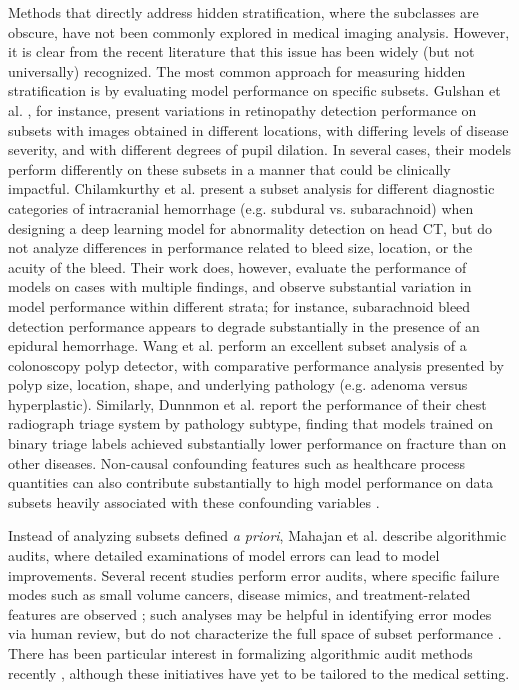 \documentclass[sigconf]{acmart}
\begin{document}
Methods that directly address hidden stratification, where the subclasses are obscure, have not been commonly explored in medical imaging analysis.  
However, it is clear from the recent literature that this issue has been widely (but not universally) recognized.  
The most common approach for measuring hidden stratification is by evaluating model performance on specific subsets.
Gulshan et al. \citep{Gulshan2016-we}, for instance, present variations in retinopathy detection performance on subsets with images obtained in different locations, with differing levels of disease severity, and with different degrees of pupil dilation.  
In several cases, their models perform differently on these subsets in a manner that could be clinically impactful.  
Chilamkurthy et al. \citep{Chilamkurthy2018-op}  present a subset analysis for different diagnostic categories of intracranial hemorrhage (e.g. subdural vs. subarachnoid) when designing a deep learning model for abnormality detection on head CT, but do not analyze differences in  performance related to bleed size, location, or the acuity of the bleed. 
 Their work does, however, evaluate the performance of models on cases with multiple findings, and observe substantial variation in model performance within different strata; for instance, subarachnoid bleed detection performance appears to degrade substantially in the presence of an epidural hemorrhage.  
Wang et al. \citep{Wang2019-jr} perform an excellent subset analysis of a colonoscopy polyp detector, with comparative performance analysis presented by polyp size, location, shape, and underlying pathology (e.g. adenoma versus hyperplastic).  
 Similarly, Dunnmon et al. \citep{Dunnmon2019-rr} report the performance of their chest radiograph triage system by pathology subtype, finding that models trained on binary triage labels achieved substantially lower performance on fracture than on other diseases.   
Non-causal confounding features such as healthcare process quantities can also contribute substantially to high model performance on data subsets heavily associated with these confounding variables \citep{Winkler2019-fw, Badgeley2019-zi, Agniel2018-qp, Zech2018-xq}.

Instead of analyzing subsets defined \textit{a priori}, Mahajan et al. \citep{Mahajan2019-yi} describe algorithmic audits, where detailed examinations of model errors can lead to model improvements.
 Several recent studies perform error audits, where specific failure modes such as small volume cancers, disease mimics, and treatment-related features are observed \citep{Campanella2019-qs, Wang2019-jr}; such analyses may be helpful in identifying error modes via human review, but do not characterize the full space of subset performance \citep{Selbst2017-gz}.  
 There has been particular interest in formalizing algorithmic audit methods recently \citep{raji2020closing}, although these initiatives have yet to be tailored to the medical setting. 
\end{document}
